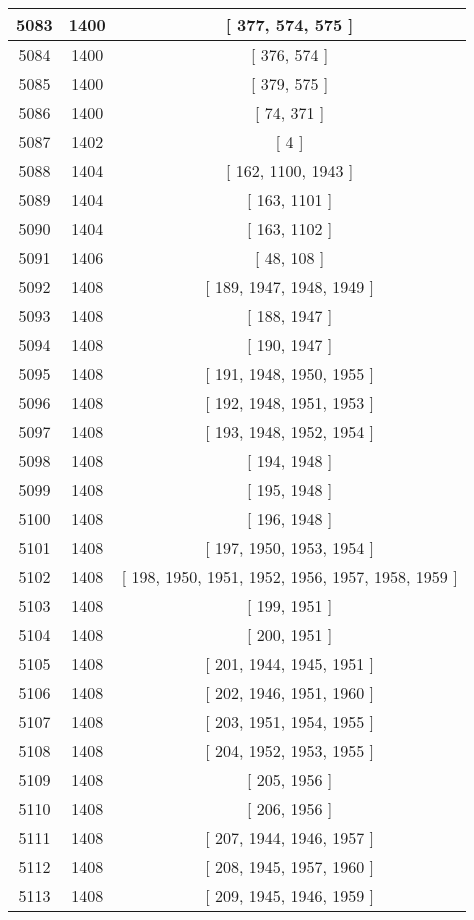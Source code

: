 \begin{center}
\begin{longtable}[H]{|| c c c ||}
\hline
5083 & 1400 & [ 377, 574, 575 ] \\ 
\hline
5084 & 1400 & [ 376, 574 ] \\ 
\hline
5085 & 1400 & [ 379, 575 ] \\ 
\hline
5086 & 1400 & [ 74, 371 ] \\ 
\hline
5087 & 1402 & [ 4 ] \\ 
\hline
5088 & 1404 & [ 162, 1100, 1943 ] \\ 
\hline
5089 & 1404 & [ 163, 1101 ] \\ 
\hline
5090 & 1404 & [ 163, 1102 ] \\ 
\hline
5091 & 1406 & [ 48, 108 ] \\ 
\hline
5092 & 1408 & [ 189, 1947, 1948, 1949 ] \\ 
\hline
5093 & 1408 & [ 188, 1947 ] \\ 
\hline
5094 & 1408 & [ 190, 1947 ] \\ 
\hline
5095 & 1408 & [ 191, 1948, 1950, 1955 ] \\ 
\hline
5096 & 1408 & [ 192, 1948, 1951, 1953 ] \\ 
\hline
5097 & 1408 & [ 193, 1948, 1952, 1954 ] \\ 
\hline
5098 & 1408 & [ 194, 1948 ] \\ 
\hline
5099 & 1408 & [ 195, 1948 ] \\ 
\hline
5100 & 1408 & [ 196, 1948 ] \\ 
\hline
5101 & 1408 & [ 197, 1950, 1953, 1954 ] \\ 
\hline
5102 & 1408 & [ 198, 1950, 1951, 1952, 1956, 1957, 1958, 1959 ] \\ 
\hline
5103 & 1408 & [ 199, 1951 ] \\ 
\hline
5104 & 1408 & [ 200, 1951 ] \\ 
\hline
5105 & 1408 & [ 201, 1944, 1945, 1951 ] \\ 
\hline
5106 & 1408 & [ 202, 1946, 1951, 1960 ] \\ 
\hline
5107 & 1408 & [ 203, 1951, 1954, 1955 ] \\ 
\hline
5108 & 1408 & [ 204, 1952, 1953, 1955 ] \\ 
\hline
5109 & 1408 & [ 205, 1956 ] \\ 
\hline
5110 & 1408 & [ 206, 1956 ] \\ 
\hline
5111 & 1408 & [ 207, 1944, 1946, 1957 ] \\ 
\hline
5112 & 1408 & [ 208, 1945, 1957, 1960 ] \\ 
\hline
5113 & 1408 & [ 209, 1945, 1946, 1959 ] \\ 

\end{longtable}
\end{center}

